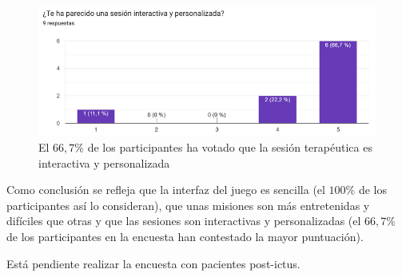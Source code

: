 \begin{figure}[ht!]
	\centering
	\begin{minipage}{0.85\linewidth}
		\centering
		\includegraphics[width=\linewidth]{figs/pregunta9.png}
	\end{minipage}
	\caption[Encuesta de satisfacción. Pregunta 9]{El $66,7\%$ de los participantes ha votado que la sesión terapéutica es interactiva y personalizada}
	\label{fig:level3}
\end{figure}

Como conclusión se refleja que la interfaz del juego es sencilla (el $100\%$ de los participantes así lo consideran), que unas misiones son más entretenidas y difíciles que otras y que las sesiones son interactivas y personalizadas (el $66,7\%$ de los participantes en la encuesta han contestado la mayor puntuación).

Está pendiente realizar la encuesta con pacientes post-ictus.
